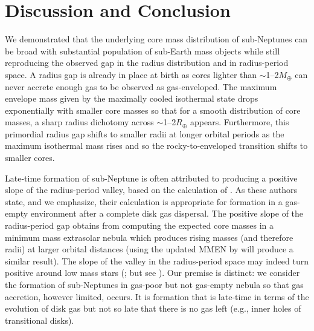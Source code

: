 \documentclass[twocolumn]{aastex63}
\begin{document}


\section{Discussion and Conclusion}
\label{sec:disc_concl}

We demonstrated that the underlying core mass distribution of sub-Neptunes can be broad with substantial population of sub-Earth mass objects while still reproducing the observed gap in the radius distribution and in radius-period space. A radius gap is already in place at birth as cores lighter than $\sim$1--2$M_\oplus$ can never accrete enough gas to be observed as gas-enveloped. The maximum envelope mass given by the maximally cooled isothermal state drops exponentially with smaller core masses so that for a smooth distribution of core masses, a sharp radius dichotomy across $\sim$1--2$R_\oplus$ appears. Furthermore, this primordial radius gap shifts to smaller radii at longer orbital periods as the maximum isothermal mass rises and so the rocky-to-enveloped transition shifts to smaller cores. 

Late-time formation of sub-Neptune is often attributed to producing a positive slope of the radius-period valley, based on the calculation of \citet{Lopez18}. As these authors state, and we emphasize, their calculation is appropriate for formation in a gas-empty environment after a complete disk gas dispersal. The positive slope of the radius-period gap obtains from computing the expected core masses in a minimum mass extrasolar nebula \citep[MMEN;][]{Chiang13} which produces rising masses (and therefore radii) at larger orbital distances (using the updated MMEN by \citet{Dai20} will produce a similar result). The slope of the valley in the radius-period space may indeed turn positive around low mass stars (\citealt{Cloutier20}; but see \citealt{Wu19}).
Our premise is distinct: we consider the formation of sub-Neptunes in gas-poor but not gas-empty nebula so that gas accretion, however limited, occurs. It is formation that is late-time in terms of the evolution of disk gas but not so late that there is no gas left (e.g., inner holes of transitional disks).
\end{document}

